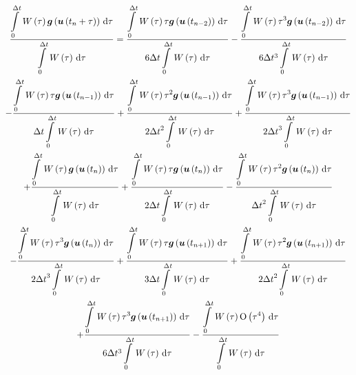 \begin{multline}
  \dfrac{\gint{0}{\Delta t}{\fnof{W}{\tau}
      \fnof{\vectr{g}}{\fnof{\vectr{u}}{t_{n}+\tau}}}{\tau}}{\gint{0}{\Delta
      t}{\fnof{W}{\tau}}{\tau}}=\dfrac{\gint{0}{\Delta
      t}{\fnof{W}{\tau}\tau\fnof{\vectr{g}}{\fnof{\vectr{u}}{t_{n-2}}}}{\tau}}{6\Delta
    t\gint{0}{\Delta t}{\fnof{W}{\tau}}{\tau}}-
  \dfrac{\gint{0}{\Delta
      t}{\fnof{W}{\tau}\tau^{3}\fnof{\vectr{g}}{\fnof{\vectr{u}}{t_{n-2}}}}{\tau}}{6\Delta
    t^{3}\gint{0}{\Delta t}{\fnof{W}{\tau}}{\tau}} \\
  -\dfrac{\gint{0}{\Delta
      t}{\fnof{W}{\tau}\tau\fnof{\vectr{g}}{\fnof{\vectr{u}}{t_{n-1}}}}{\tau}}{{\Delta
      t}\gint{0}{\Delta t}{\fnof{W}{\tau}}{\tau}}
  +\dfrac{\gint{0}{\Delta
      t}{\fnof{W}{\tau}\tau^{2}\fnof{\vectr{g}}{\fnof{\vectr{u}}{t_{n-1}}}}{\tau}}{2{\Delta
    t}^{2}\gint{0}{\Delta t}{\fnof{W}{\tau}}{\tau}}
  +\dfrac{\gint{0}{\Delta
      t}{\fnof{W}{\tau}\tau^{3}\fnof{\vectr{g}}{\fnof{\vectr{u}}{t_{n-1}}}}{\tau}}{2{\Delta
    t}^{3}\gint{0}{\Delta t}{\fnof{W}{\tau}}{\tau}} \\
  +\dfrac{\gint{0}{\Delta
      t}{\fnof{W}{\tau}\fnof{\vectr{g}}{\fnof{\vectr{u}}{t_{n}}}}{\tau}}{\gint{0}{\Delta t}{\fnof{W}{\tau}}{\tau}}
  +\dfrac{\gint{0}{\Delta
      t}{\fnof{W}{\tau}\tau\fnof{\vectr{g}}{\fnof{\vectr{u}}{t_{n}}}}{\tau}}{2{\Delta
    t}\gint{0}{\Delta t}{\fnof{W}{\tau}}{\tau}}
  -\dfrac{\gint{0}{\Delta
      t}{\fnof{W}{\tau}\tau^{2}\fnof{\vectr{g}}{\fnof{\vectr{u}}{t_{n}}}}{\tau}}{{\Delta
    t}^{2}\gint{0}{\Delta t}{\fnof{W}{\tau}}{\tau}} \\
  -\dfrac{\gint{0}{\Delta
      t}{\fnof{W}{\tau}\tau^{3}\fnof{\vectr{g}}{\fnof{\vectr{u}}{t_{n}}}}{\tau}}{2{\Delta
      t}^{3}\gint{0}{\Delta t}{\fnof{W}{\tau}}{\tau}}
  +\dfrac{\gint{0}{\Delta
      t}{\fnof{W}{\tau}\tau\fnof{\vectr{g}}{\fnof{\vectr{u}}{t_{n+1}}}}{\tau}}{3{\Delta
    t}\gint{0}{\Delta t}{\fnof{W}{\tau}}{\tau}}
  +\dfrac{\gint{0}{\Delta
      t}{\fnof{W}{\tau}\tau^{2}\fnof{\vectr{g}}{\fnof{\vectr{u}}{t_{n+1}}}}{\tau}}{2{\Delta
    t}^{2}\gint{0}{\Delta t}{\fnof{W}{\tau}}{\tau}} \\
  +\dfrac{\gint{0}{\Delta
      t}{\fnof{W}{\tau}\tau^{3}\fnof{\vectr{g}}{\fnof{\vectr{u}}{t_{n+1}}}}{\tau}}{6\Delta
    t^{3}\gint{0}{\Delta t}{\fnof{W}{\tau}}{\tau}}
  -\dfrac{\gint{0}{\Delta
      t}{\fnof{W}{\tau}\orderof{\tau^{4}}}{\tau}}{\gint{0}{\Delta t}{\fnof{W}{\tau}}{\tau}}
\end{multline}

